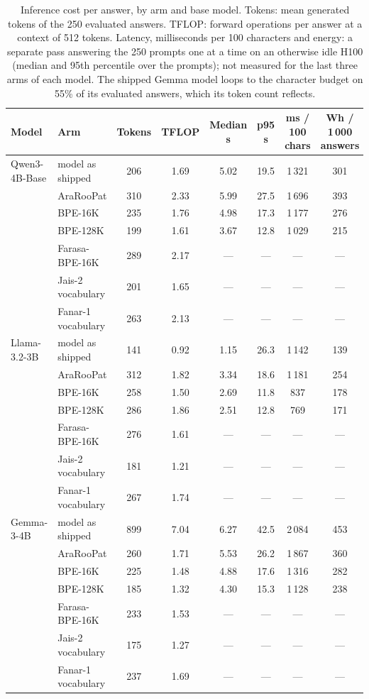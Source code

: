 \documentclass[a4paper,fleqn]{cas-sc}
\begin{document}
\begin{table}[t]
\centering
\caption{Inference cost per answer, by arm and base model. Tokens: mean generated tokens of the 250 evaluated answers. TFLOP: forward operations per answer at a context of 512 tokens. Latency, milliseconds per 100 characters and energy: a separate pass answering the 250 prompts one at a time on an otherwise idle H100 (median and 95th percentile over the prompts); not measured for the last three arms of each model. The shipped Gemma model loops to the character budget on 55\% of its evaluated answers, which its token count reflects.}
\label{tab:cost}
\small
\begin{tabular}{@{}llcccccc@{}}
\toprule
Model & Arm & Tokens & TFLOP & Median s & p95 s & ms / 100 chars & Wh / 1\,000 answers \\
\midrule
Qwen3-4B-Base & model as shipped & 206 & 1.69 & 5.02 & 19.5 & 1\,321 & 301 \\
 & AraRooPat & 310 & 2.33 & 5.99 & 27.5 & 1\,696 & 393 \\
 & BPE-16K & 235 & 1.76 & 4.98 & 17.3 & 1\,177 & 276 \\
 & BPE-128K & 199 & 1.61 & 3.67 & 12.8 & 1\,029 & 215 \\
 & Farasa-BPE-16K & 289 & 2.17 & --- & --- & --- & --- \\
 & Jais-2 vocabulary & 201 & 1.65 & --- & --- & --- & --- \\
 & Fanar-1 vocabulary & 263 & 2.13 & --- & --- & --- & --- \\
\midrule
Llama-3.2-3B & model as shipped & 141 & 0.92 & 1.15 & 26.3 & 1\,142 & 139 \\
 & AraRooPat & 312 & 1.82 & 3.34 & 18.6 & 1\,181 & 254 \\
 & BPE-16K & 258 & 1.50 & 2.69 & 11.8 & 837 & 178 \\
 & BPE-128K & 286 & 1.86 & 2.51 & 12.8 & 769 & 171 \\
 & Farasa-BPE-16K & 276 & 1.61 & --- & --- & --- & --- \\
 & Jais-2 vocabulary & 181 & 1.21 & --- & --- & --- & --- \\
 & Fanar-1 vocabulary & 267 & 1.74 & --- & --- & --- & --- \\
\midrule
Gemma-3-4B & model as shipped & 899 & 7.04 & 6.27 & 42.5 & 2\,084 & 453 \\
 & AraRooPat & 260 & 1.71 & 5.53 & 26.2 & 1\,867 & 360 \\
 & BPE-16K & 225 & 1.48 & 4.88 & 17.6 & 1\,316 & 282 \\
 & BPE-128K & 185 & 1.32 & 4.30 & 15.3 & 1\,128 & 238 \\
 & Farasa-BPE-16K & 233 & 1.53 & --- & --- & --- & --- \\
 & Jais-2 vocabulary & 175 & 1.27 & --- & --- & --- & --- \\
 & Fanar-1 vocabulary & 237 & 1.69 & --- & --- & --- & --- \\
\bottomrule
\end{tabular}
\end{table}
\end{document}
